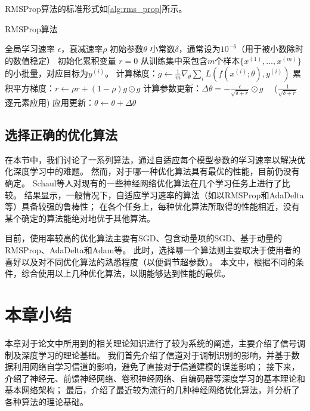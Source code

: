 RMSProp算法的标准形式如\ref{alg:rms_prop}所示。
\begin{algorithm}[ht]
	\caption{RMSProp算法}
	\label{alg:rms_prop}
	\begin{algorithmic}
		\REQUIRE 全局学习速率 $\epsilon$，衰减速率$\rho$
		\REQUIRE  初始参数$\theta$
		\REQUIRE 小常数$\delta$，通常设为$10^{-6}$（用于被小数除时的数值稳定）
		\STATE 初始化累积变量 $r = 0$
		\STATE 从训练集中采包含$m$个样本$\{ x^{(1)},\dots, x^{(m)}\}$ 的小批量，对应目标为$y^{(i)}$。
		\STATE 计算梯度：$g \leftarrow  
		\frac{1}{m} \nabla_{\theta} \sum_i L(f(x^{(i)};\theta),y^{(i)})$ 
		\STATE 累积平方梯度：$r \leftarrow \rho
		r + (1-\rho) g \odot g$
		\STATE 计算参数更新：$\Delta \theta =
		-\frac{\epsilon}{\sqrt{\delta + r}} \odot g$  \ \  ($\frac{1}{\sqrt{\delta + r}}$ 逐元素应用)
		\STATE 应用更新：$\theta \leftarrow \theta + \Delta \theta$
		\ENDWHILE
	\end{algorithmic}
\end{algorithm}

\subsection{选择正确的优化算法}
\label{sec:choosing_the_right_optimization_algorithms}
在本节中，我们讨论了一系列算法，通过自适应每个模型参数的学习速率以解决优化深度学习中的难题。
然而，对于哪一种优化算法具有最优的性能，目前仍没有确定。
Schaul等人对现有的一些神经网络优化算法在几个学习任务上进行了比较\cite{schaul2013unit}。
结果显示，一般情况下，自适应学习速率的算法（如以RMSProp和AdaDelta等）具备较强的鲁棒性；
在各个任务上，每种优化算法所取得的性能相近，没有某个确定的算法能绝对地优于其他算法。\par

目前，使用率较高的优化算法主要有SGD、包含动量项的SGD、基于动量的RMSProp、AdaDelta和Adam等。
此时，选择哪一个算法则主要取决于使用者的喜好以及对不同优化算法的熟悉程度（以便调节超参数）。
本文中，根据不同的条件，综合使用以上几种优化算法，以期能够达到性能的最优。

\section{本章小结}
本章对于论文中所用到的相关理论知识进行了较为系统的阐述，主要介绍了信号调制及深度学习的理论基础。
我们首先介绍了信道对于调制识别的影响，并基于数据利用网络自学习信道的影响，避免了直接对于信道建模的误差影响；
接下来，介绍了神经元、前馈神经网络、卷积神经网络、自编码器等深度学习的基本理论和基本网络架构；
最后，介绍了最近较为流行的几种神经网络优化算法，并分析了各种算法的理论基础。
